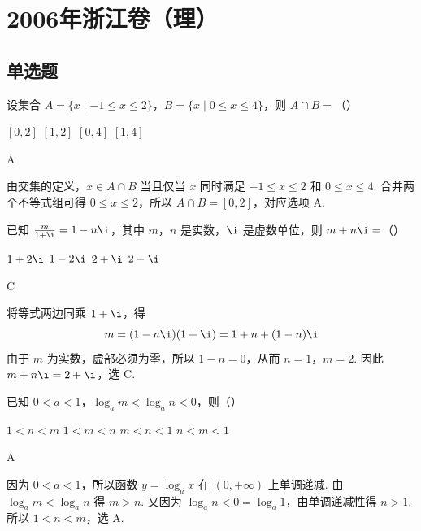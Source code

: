 \chapter{2006年浙江卷（理）}
\section{单选题}
\begin{problem}
设集合 \(A = \{x \mid -1 \leqslant x \leqslant 2\}\)，\(B = \{x \mid 0 \leqslant x \leqslant 4\}\)，则 \(A \cap B =\)（\quad）

\choices
    {\([0,2]\)}
    {\([1,2]\)}
    {\([0,4]\)}
    {\([1,4]\)}

\begin{answer}
A
\end{answer}

\begin{solution}
由交集的定义，\(x\in A\cap B\) 当且仅当 \(x\) 同时满足 \(-1\leqslant x\leqslant2\) 和 \(0\leqslant x\leqslant4\). 合并两个不等式组可得 \(0\leqslant x\leqslant2\)，所以 \(A\cap B=[0,2]\)，对应选项 A.
\end{solution}
\end{problem}

\begin{problem}
已知 \(\frac{m}{1 + \i} = 1 - n\i\)，其中 \(m\)，\(n\) 是实数，\(\i\) 是虚数单位，则 \(m + n\i =\)（\quad）

\choices
    {\(1 + 2\i\)}
    {\(1 - 2\i\)}
    {\(2 + \i\)}
    {\(2 - \i\)}

\begin{answer}
C
\end{answer}

\begin{solution}
将等式两边同乘 \(1+\i\)，得
\[
m=(1-n\i)(1+\i)=1+n+(1-n)\i
\]
由于 \(m\) 为实数，虚部必须为零，所以 \(1-n=0\)，从而 \(n=1\)，\(m=2\). 因此 \(m+n\i=2+\i\)，选 C.
\end{solution}
\end{problem}

\begin{problem}
已知 \(0 < a < 1\)，\(\log_a m < \log_a n < 0\)，则（\quad）

\choices
    {\(1 < n < m\)}
    {\(1 < m < n\)}
    {\(m < n < 1\)}
    {\(n < m < 1\)}

\begin{answer}
A
\end{answer}

\begin{solution}
因为 \(0<a<1\)，所以函数 \(y=\log_a x\) 在 \((0,+\infty)\) 上单调递减. 由 \(\log_a m<\log_a n\) 得 \(m>n\). 又因为 \(\log_a n<0=\log_a1\)，由单调递减性得 \(n>1\). 所以 \(1<n<m\)，选 A.
\end{solution}
\end{problem}

